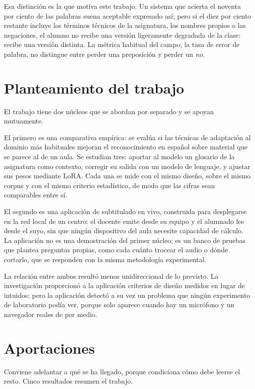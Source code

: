 Esa distinción es la que motiva este trabajo. Un sistema que acierta el noventa por ciento
de las palabras suena aceptable expresado así; pero si el diez por ciento restante incluye
los términos técnicos de la asignatura, los nombres propios o las negaciones, el alumno no
recibe una versión ligeramente degradada de la clase: recibe una versión distinta. La
métrica habitual del campo, la tasa de error de palabra, no distingue entre perder una
preposición y perder un \emph{no}.

\section{Planteamiento del trabajo}

El trabajo tiene dos núcleos que se abordan por separado y se apoyan mutuamente.

El primero es una comparativa empírica: se evalúa si las técnicas de adaptación al dominio
más habituales mejoran el reconocimiento en español sobre material que se parece al de un
aula. Se estudian tres: aportar al modelo un glosario de la asignatura como contexto,
corregir su salida con un modelo de lenguaje, y ajustar sus pesos mediante LoRA. Cada una
se mide con el mismo diseño, sobre el mismo corpus y con el mismo criterio estadístico, de
modo que las cifras sean comparables entre sí.

El segundo es una aplicación de subtitulado en vivo, construida para desplegarse en la red
local de un centro: el docente emite desde su equipo y el alumnado lee desde el suyo, sin
que ningún dispositivo del aula necesite capacidad de cálculo. La aplicación no es una
demostración del primer núcleo; es un banco de pruebas que plantea preguntas propias, como
cada cuánto trocear el audio o dónde cortarlo, que se responden con la misma metodología
experimental.

La relación entre ambos resultó menos unidireccional de lo previsto. La investigación
proporcionó a la aplicación criterios de diseño medidos en lugar de intuidos; pero la
aplicación detectó a su vez un problema que ningún experimento de laboratorio podía ver,
porque solo aparece cuando hay un micrófono y un navegador reales de por medio.

\section{Aportaciones}

Conviene adelantar a qué se ha llegado, porque condiciona cómo debe leerse el resto. Cinco
resultados resumen el trabajo.

